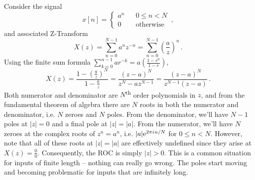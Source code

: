 \begin{exmp}
  Consider the signal
  \begin{displaymath}
    x[n] = \left\{\begin{array}{ccl}
    a^n & & 0 \leq n < N \\
    0 & & \mathrm{otherwise}
    \end{array}\right. \,,
  \end{displaymath}
  and associated Z-Transform
  \begin{displaymath}
    X(z) = \sum_{n=0}^{N-1}a^n z^{-n} = \sum_{n=0}^{N-1}\left(\frac{a}{z}\right)^n \,.
  \end{displaymath}
  Using the finite sum formula $\sum_{k=0}^{n-1}ar^{-k} = a\left(\frac{1-r^n}{1 - r}\right)$,
  \begin{displaymath}
    X(z) = \frac{1 - \left(\frac{a}{z}\right)^N}{1 - \frac{a}{z}} = \frac{(z-a)^N}{z^N - az^{N-1}}
    = \frac{(z-a)^N}{z^{N-1}(z-a)} \,.
  \end{displaymath}
  Both numerator and denominator are $N$\textsuperscript{th} order polynomials in
  $z$, and from the fundamental theorem of algebra there are $N$ roots in
  both the numerator and denominator, i.e. $N$ zeroes and $N$ poles. From the
  denominator, we'll have $N-1$ poles at $|z|=0$ and a final pole at $|z|=|a|$.
  From the numerator, we'll have $N$ zeroes at the complex roots of $z^n = a^n$,
  i.e. $|a|\mathrm{e}^{2\pi {i\mkern1mu} n / N}$ for $0\leq n < N$. However, note that all of
  these roots at $|z| = |a|$ are effectively undefined since they arise at
  $X(z) = \frac{0}{0}$. Consequently, the ROC is simply $|z| > 0$. This is a
  common situation for inputs of finite length -- nothing can really go wrong.
  The poles start moving and becoming problematic for inputs that are
  infinitely long.
\end{exmp}
%
